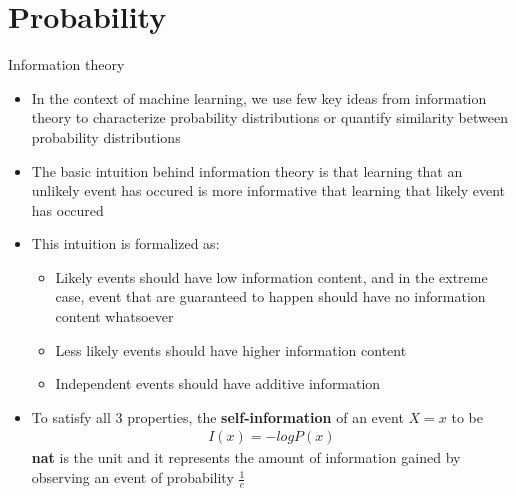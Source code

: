 \documentclass[10pt,mathserif]{beamer}
\begin{document}
\section{Probability}
\begin{frame}{Information theory}
\begin{itemize}
\item In the context of machine learning, we use few key ideas from information theory to characterize 
probability distributions or quantify similarity between probability distributions 
\item The basic intuition behind information theory is that learning that an unlikely event has occured is more
informative that learning that likely event has occured
\item This intuition is formalized as:
\begin{itemize}
\item Likely events should have low information content, and in the extreme case, event that are guaranteed to happen should have no information content whatsoever
\item Less likely events should have higher information content
\item Independent events should have additive information 
\end{itemize} 
\item To satisfy all 3 properties, the \textbf{self-information} of an event $X=x$ to be
\begin{align}
I(x) = -log P(x)
\end{align}
\textbf{nat} is the unit and it represents the amount of information gained by observing an event of probability 
$\frac{1}{e}$
\end{itemize}
\end{frame}
\end{document}
